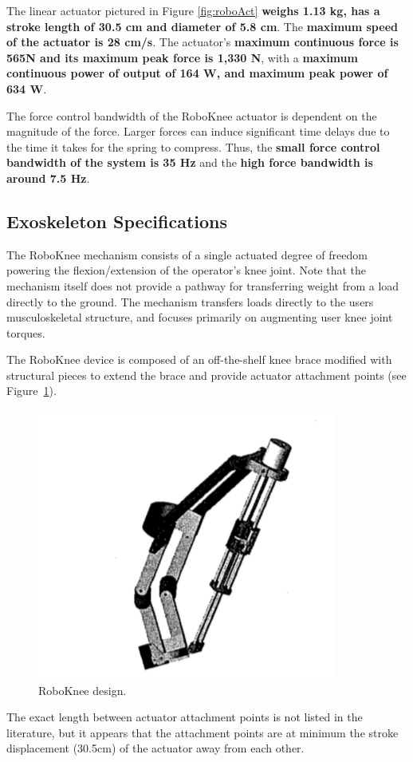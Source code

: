 \begin{refsection}
The linear actuator pictured in Figure \ref{fig:roboAct} { \bf weighs 1.13 kg, has a stroke length of 30.5 cm and diameter of 5.8 cm}.  The {\bf maximum speed of the actuator is 28 cm/s}.  The actuator's {\bf maximum continuous force is 565N and its maximum peak force is 1,330 N}, with a {\bf maximum continuous power of output of 164 W, and maximum peak power of 634 W}.   

The force control bandwidth of the RoboKnee actuator is dependent on the magnitude of the force.  Larger forces can induce significant time delays due to the time it takes for the spring to compress.  Thus, the {\bf small force control bandwidth of the system is 35 Hz} and the {\bf high force bandwidth is around 7.5 Hz}. 
 
 \subsection{Exoskeleton Specifications}
 
 The RoboKnee mechanism consists of a single actuated degree of freedom powering the flexion/extension of the operator's knee joint.  Note that the mechanism itself does not provide a pathway for transferring weight from a load directly to the ground.  The mechanism transfers loads directly to the users musculoskeletal structure, and focuses primarily on augmenting user knee joint torques.
 
 The RoboKnee device is composed of an off-the-shelf knee brace modified with structural pieces to extend the brace and provide actuator attachment points (see Figure~\ref{fig:roboKnee}).
 \begin{figure}[thpb]
\centering
\includegraphics[width=3.in]{exos/figs/roboKnee/roboBrace}
  \caption{RoboKnee design.}
 \label{fig:roboKnee}   
 \end{figure}
 The exact length between actuator attachment points is not listed in the literature, but it appears that the attachment points are at minimum the
stroke displacement (30.5cm) of the actuator away from each other.
   

\end{refsection}
